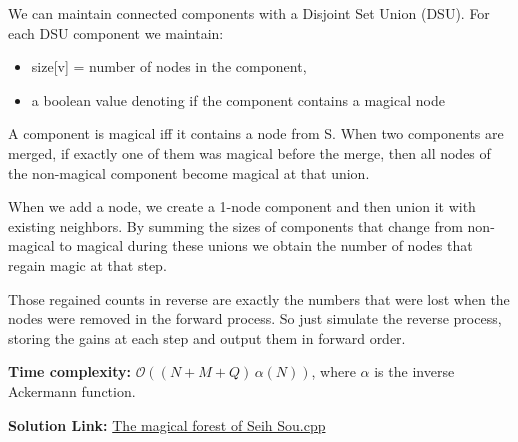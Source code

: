 \documentclass{article}
\newcommand{\gr}[1]{\foreignlanguage{greek}{#1}}
\begin{document}
    \noindent
        We can maintain connected components with a Disjoint Set Union (DSU). For each DSU component we maintain:
        \begin{itemize}
            \item size[v] = number of nodes in the component,
            \item a boolean value denoting if the component contains a magical node
        \end{itemize}
    
    \noindent
        A component is magical iff it contains a node from S. When two components are merged, if exactly one of them was magical before the merge, then all nodes of the non-magical component become magical at that union. %
    
    \noindent
        When we add a node, we create a 1-node component and then union it with existing neighbors. By summing the sizes of components that change from non-magical to magical during these unions we obtain the number of nodes that regain magic at that step.
    
    \vspace{0.5em}
    
    \noindent
        Those regained counts in reverse are exactly the numbers that were lost when the nodes were removed in the forward process. So just simulate the reverse process, storing the gains at each step and output them in forward order.
        
    \vspace{1em}
    
    \noindent\textbf{Time complexity:} \(\mathcal{O}((N+M+Q)\,\alpha(N))\), where \(\alpha\) is the inverse Ackermann function. %
    
    
    \vspace{1em}
    
    \noindent
    \textbf{Solution Link:} \href{https://github.com/StathisKons/GRCPC-2024-Editorial-Implementations/blob/main/Sample%20Implementations/H.%20The%20magical%20forest%20of%20Seih%20Sou.cpp}{The magical forest of Seih Sou.cpp}
    
\end{document}
